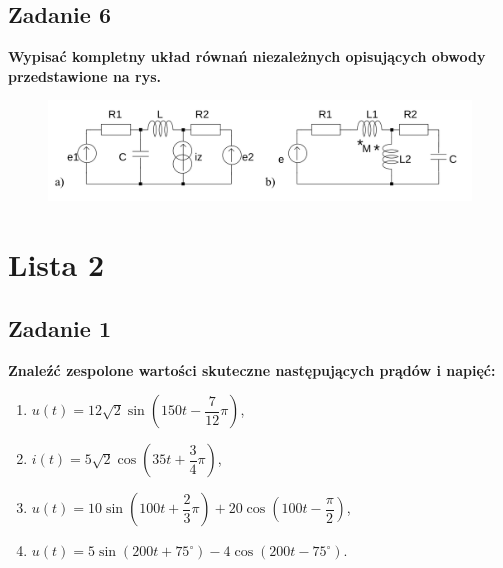 \documentclass[12pt, a4paper]{article}
\begin{document}
\subsection{Zadanie 6}
\textbf{Wypisać kompletny układ równań niezależnych opisujących obwody przedstawione na
  rys.}
\begin{figure}[H]
  \centering
  \includegraphics[width = \textwidth]{./images/Lista_1/Zadanie_6.png}
\end{figure}

\section{Lista 2}
\subsection{Zadanie 1}
\textbf{Znaleźć zespolone wartości skuteczne następujących prądów i napięć:}
\begin{enumerate}[label=\alph*)]
  \item $u(t) = 12\sqrt{2} \sin\left( 150t-\dfrac{7}{12}\pi \right)$,
  \item $i(t) = 5\sqrt{2}\cos\left( 35t+\dfrac{3}{4}\pi \right)$,
  \item $u(t) = 10\sin\left(100t+\dfrac{2}{3}\pi\right)+
          20\cos\left(100t-\dfrac{\pi}{2}\right)$,
  \item $u(t) = 5\sin\left(200t+75^\circ\right)-4\cos\left(200t-75^\circ\right)$.
\end{enumerate}
\end{document}
